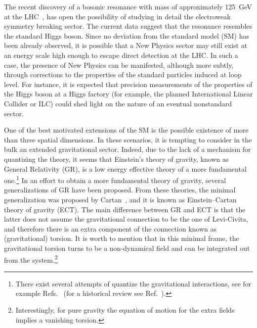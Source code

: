 \documentclass{ws-mpla}
\renewcommand{\(}{\left(}
\renewcommand{\)}{\right)}
\renewcommand{\[}{\left[}
\renewcommand{\]}{\right]}
\begin{document}
The recent discovery of a bosonic resonance with mass of approximately \SI{125}{\GeV} at the LHC~\cite{Aaltonen:2012qt,Aad:2012tfa,Chatrchyan:2012ufa,Aad:2015zhl}, has open the possibility of studying in detail the electroweak symmetry breaking sector. The current data suggest that the resonance resembles the standard Higgs boson.   Since no deviation from the standard model (SM) has been already observed, it is possible that a New Physics sector may still exist at an energy scale high enough to escape direct detection at the LHC. In such a case, the presence of New Physics can be manifested, although more subtly, through corrections to the properties of the standard particles induced at loop level. For instance, it is expected that  precision measurements of the properties of the Higgs boson at a Higgs factory (for example, the planned International Linear Collider or ILC) could shed light on the nature of an eventual nonstandard sector.

One of the best motivated extensions of the SM is the possible existence of more than three spatial dimensions. In these scenarios, it is tempting to consider in the bulk an extended gravitational sector. Indeed, due to the lack of a mechanism for quantizing the theory, it seems that Einstein's theory of gravity, known as General Relativity (GR), is a low energy effective theory of a more fundamental one.\footnote{There exist several attempts of quantize the gravitational interactions, see for example Refs.~ (for a historical review see Ref.~).} In an effort to obtain a more fundamental theory of gravity, several generalizations of GR have been proposed. From these theories, the minimal generalization was proposed by Cartan~\cite{Cartan1922,Cartan1923,Cartan1924,Cartan1925,Cartan-Einstein}, and it is known as Einstein--Cartan theory of gravity (ECT). The main difference between GR and ECT is that the latter does not assume the gravitational connection to be the one of Levi-Civita, and therefore there is an extra component of the connection known as (gravitational) torsion. It is worth to mention that in this minimal frame, the gravitational torsion turns to be a non-dynamical field and can be integrated out from the system.\footnote{Interestingly, for pure gravity the equation of motion for the extra fields implies a vanishing torsion.}
\end{document}
